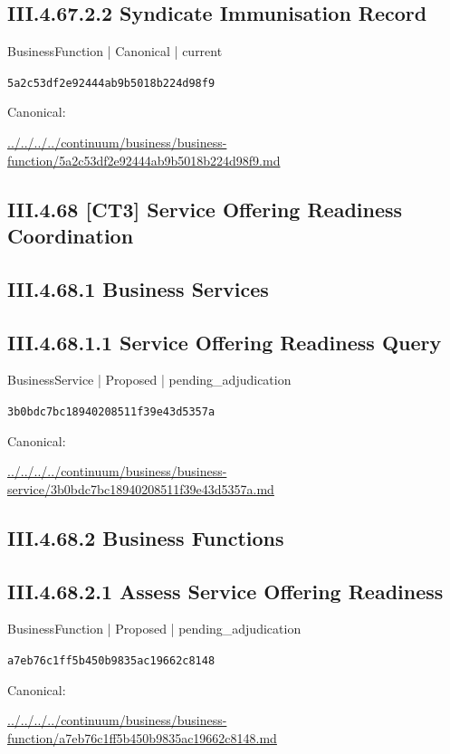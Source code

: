 \documentclass[10pt,a4paper]{article}
\begin{document}
\subsection*{III.4.67.2.2 Syndicate Immunisation Record}
{\small BusinessFunction | Canonical | current}\par
\texttt{5a2c53df2e92444ab9b5018b224d98f9}\par
Canonical: \par
{\footnotesize\url{../../../../continuum/business/business-function/5a2c53df2e92444ab9b5018b224d98f9.md}}\par
\subsection*{III.4.68 [CT3] Service Offering Readiness Coordination}
\subsection*{III.4.68.1 Business Services}
\subsection*{III.4.68.1.1 Service Offering Readiness Query}
{\small BusinessService | Proposed | pending\_adjudication}\par
\texttt{3b0bdc7bc18940208511f39e43d5357a}\par
Canonical: \par
{\footnotesize\url{../../../../continuum/business/business-service/3b0bdc7bc18940208511f39e43d5357a.md}}\par
\subsection*{III.4.68.2 Business Functions}
\subsection*{III.4.68.2.1 Assess Service Offering Readiness}
{\small BusinessFunction | Proposed | pending\_adjudication}\par
\texttt{a7eb76c1ff5b450b9835ac19662c8148}\par
Canonical: \par
{\footnotesize\url{../../../../continuum/business/business-function/a7eb76c1ff5b450b9835ac19662c8148.md}}\par
\end{document}
